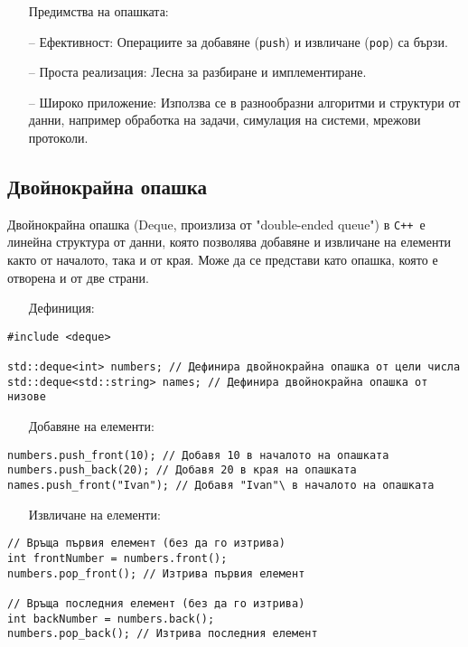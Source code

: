 \documentclass[oneside]{book}
\newcommand*{\code}[1]{\texttt{#1}}
\newcommand*{\cpp}{\texttt{C++}\ }
\begin{document}
\begin{itemize}\item[Предимства] на опашката:\end{itemize}
\begin{itemize}
    \item[--] Ефективност: Операциите за добавяне (\code{push}) и извличане (\code{pop}) са бързи.
    \item[--] Проста реализация: Лесна за разбиране и имплементиране.
    \item[--] Широко приложение: Използва се в разнообразни алгоритми и структури от данни, например обработка на задачи, симулация на системи, мрежови протоколи.
\end{itemize}

\subsection{Двойнокрайна опашка}
Двойнокрайна опашка (Deque, произлиза от "double-ended queue") в \cpp е линейна структура от данни, която позволява добавяне и извличане на елементи както от началото, така и от края. Може да се представи като опашка, която е отворена и от две страни.
\pagebreak
\begin{itemize}\item[Дефиниция:]\end{itemize}
\begin{mdframed}\begin{lstlisting}
#include <deque>

std::deque<int> numbers; // Дефинира двойнокрайна опашка от цели числа
std::deque<std::string> names; // Дефинира двойнокрайна опашка от низове
\end{lstlisting}\end{mdframed}

\begin{itemize}\item[Добавяне] на елементи:\end{itemize}
\begin{mdframed}\begin{lstlisting}
numbers.push_front(10); // Добавя 10 в началото на опашката
numbers.push_back(20); // Добавя 20 в края на опашката
names.push_front("Ivan"); // Добавя "Ivan"\ в началото на опашката
\end{lstlisting}\end{mdframed}

\begin{itemize}\item[Извличане] на елементи:\end{itemize}
\begin{mdframed}\begin{lstlisting}
// Връща първия елемент (без да го изтрива)
int frontNumber = numbers.front();
numbers.pop_front(); // Изтрива първия елемент

// Връща последния елемент (без да го изтрива)
int backNumber = numbers.back();
numbers.pop_back(); // Изтрива последния елемент
\end{lstlisting}\end{mdframed}
\end{document}
